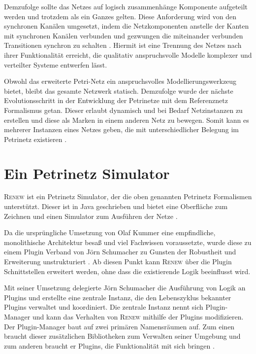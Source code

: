 	Demzufolge sollte das Netzes auf logisch zusammenhänge Komponente aufgeteilt werden und trotzdem als ein Ganzes gelten. Diese Anforderung wird von den synchronen Kanälen umgesetzt, indem die Netzkomponenten anstelle der Kanten mit synchronen Kanälen verbunden und gezwungen die miteinander verbunden Transitionen synchron zu schalten \cite{Kummer02}. Hiermit ist eine Trennung des Netzes nach ihrer Funktionalität erreicht, die qualitativ anspruchsvolle Modelle komplexer und verteilter Systeme entwerfen lässt.\bigbreak

	Obwohl das erweiterte Petri-Netz ein anspruchsvolles Modellierungswerkzeug bietet, bleibt das gesamte Netzwerk statisch. Demzufolge wurde der nächste Evolutionsschritt in der Entwicklung der Petrinetze mit dem Referenznetz Formalismus getan. Dieser erlaubt dynamisch und bei Bedarf Netzinstanzen zu erstellen und diese als Marken in einem anderen Netz zu bewegen. Somit kann es mehrerer Instanzen eines Netzes geben, die mit unterschiedlicher Belegung im Petrinetz existieren \cite{Kummer02}.

\section{Ein Petrinetz Simulator} \label{sec:EPS}

	\textsc{Renew} ist ein Petrinetz Simulator, der die oben genannten Petrinetz Formalismen unterstützt. Dieser ist in Java geschrieben und bietet eine Oberfläche zum Zeichnen und einen Simulator zum Ausführen der Netze \cite{Kummer+99a}.\bigbreak

	Da die ursprüngliche Umsetzung von Olaf Kummer eine empfindliche, monolithische Architektur besaß und viel Fachwissen voraussetzte, wurde diese zu einem Plugin Verband von Jörn Schumacher zu Gunsten der Robustheit und Erweiterung unstrukturiert \cite{Schumacher03}. Ab diesen Punkt kann \textsc{Renew} über die Plugin Schnittstellen erweitert werden, ohne dass die existierende Logik beeinflusst wird.\bigbreak

	Mit seiner Umsetzung delegierte Jörn Schumacher die Ausführung von Logik an Plugins und erstellte eine zentrale Instanz, die den Lebenszyklus bekannter Plugins verwaltet und koordiniert. Die zentrale Instanz nennt sich Plugin-Manager und kann das Verhalten von \textsc{Renew} mithilfe der Plugins modifizieren. Der Plugin-Manager baut auf zwei primären Namensräumen auf. Zum einen braucht dieser zusätzlichen Bibliotheken zum Verwalten seiner Umgebung und zum anderen braucht er Plugins, die Funktionalität mit sich bringen \cite{Duvigneau09}.

